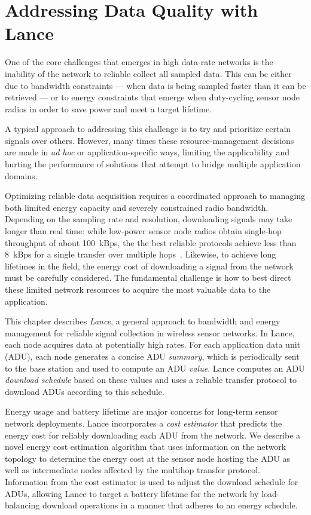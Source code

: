 \chapter{Addressing Data Quality with Lance}
\label{chapter-lance}

One of the core challenges that emerges in high data-rate networks is the
inability of the network to reliable collect all sampled data. This can be
either due to bandwidth constraints --- when data is being sampled faster
than it can be retrieved --- or to energy constraints that emerge when
duty-cycling sensor node radios in order to save power and meet a target
lifetime.

A typical approach to addressing this challenge is to try and prioritize
certain signals over others. However, many times these resource-management
decisions are made in \textit{ad hoc} or application-specific ways, limiting
the applicability and hurting the performance of solutions that attempt to
bridge multiple application domains.

Optimizing reliable data acquisition requires a coordinated approach to
managing both limited energy capacity and severely constrained radio
bandwidth. Depending on the sampling rate and resolution, downloading signals
may take longer than real time: while low-power sensor node radios obtain
single-hop throughput of about 100~kBps, the the best reliable protocols
achieve less than 8~kBps for a single transfer over multiple
hops~\cite{flush-sensys07}. Likewise, to achieve long lifetimes in the field,
the energy cost of downloading a signal from the network must be carefully
considered. The fundamental challenge is how to best direct these limited
network resources to acquire the most valuable data to the application.

This chapter describes \textit{Lance}, a general approach to bandwidth and
energy management for reliable signal collection in wireless sensor networks.
In Lance, each node acquires data at potentially high rates. For each
application data unit (ADU), each node generates a concise ADU
\textit{summary}, which is periodically sent to the base station and used to
compute an ADU \textit{value}. Lance computes an ADU \textit{download
schedule} based on these values and uses a reliable transfer protocol to
download ADUs according to this schedule.

Energy usage and battery lifetime are major concerns for long-term sensor
network deployments. Lance incorporates a \textit{cost estimator} that
predicts the energy cost for reliably downloading each ADU from the network.
We describe a novel energy cost estimation algorithm that uses information on
the network topology to determine the energy cost at the sensor node hosting
the ADU as well as intermediate nodes affected by the multihop transfer
protocol. Information from the cost estimator is used to adjust the download
schedule for ADUs, allowing Lance to target a battery lifetime for the
network by load-balancing download operations in a manner that adheres to an
energy schedule.

